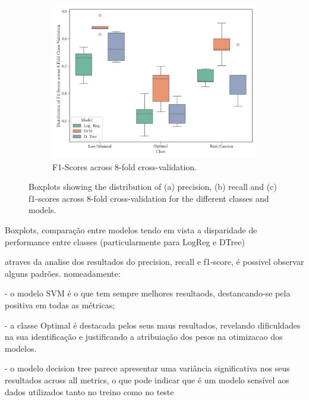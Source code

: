 \documentclass[conference]{IEEEtran}
\begin{document}
\begin{figure}[H]
    \vspace{0.5cm}

    \begin{subfigure}[1]{\linewidth}
        \centering
        \includegraphics[width=1\linewidth]{assets/box_f1score.png}
        \caption{F1-Scores across 8-fold cross-validation.}
        \label{box_f1score}
    \end{subfigure}
    
    \caption{Boxplots showing the distribution of (a) precision, (b) recall and (c) f1-scores across 8-fold cross-validation for the different classes and models.}
    \label{box_plots1}
\end{figure}


Boxplots, comparação entre modelos tendo em vista a disparidade de performance entre classes (particularmente para LogReg e DTree)

atraves da analise dos resultados do precision, recall e f1-score, é possivel observar alguns padrões. nomeadamente:

- o modelo SVM é o que tem sempre melhores resultaods, destancando-se pela positiva em todas as métricas;

- a classe Optimal é destacada pelos seus maus resultados, revelando dificuldades na sua identificação e justificando a atribuiação dos pesos na otimizacao dos modelos.

- o modelo decision tree parece apresentar uma variância significativa nos seus resultados across all metrics, o que pode indicar que é um modelo sensível aos dados utilizados tanto no treino como no teste
\end{document}
